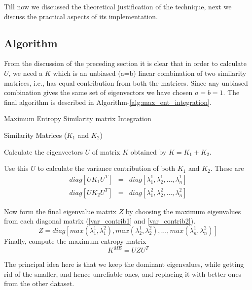 Till now we discussed the theoretical justification of the technique, next we discuss the practical aspects of its implementation.

\subsection{Algorithm}
From the discussion of the preceding section it is clear that in order to calculate $U$, we need a $K$ which is an unbiased (a=b) linear combination of two similarity matrices, i.e., has equal contribution from both the matrices. Since any unbiased combination gives the same set of eigenvectors we have chosen $a=b=1$. The final algorithm is described in Algorithm-\ref{alg:max_ent_integration}.

\begin{algorithm}[h]
\caption{Maximum Entropy Similarity matrix Integration}
\label{alg:max_ent_integration}
\begin{algorithmic}[1]
\REQUIRE Similarity Matrices ($K_{1}$ and $K_{2}$) 

\STATE Calculate the eigenvectors $U$ of matrix $K$ obtained by $K = K_{1} + K_{2}$.

\STATE Use this $U$ to calculate the variance contribution of both $K_{1}$ and $K_{2}$. These are  
\begin{eqnarray}
	diag[UK_{1}U^{T}] &=&  diag[\lambda^{1}_{1},\lambda^{1}_{2},\dots,\lambda^{1}_{n}] \label{var_contrib1} \\
	diag[UK_{2}U^{T}] &=&  diag[\lambda^{2}_{1},\lambda^{2}_{2},\dots,\lambda^{2}_{n}] \label{var_contrib2}
\end{eqnarray}

\STATE Now form the final eigenvalue matrix $Z$ by choosing the maximum eigenvalues from each diagonal matrix (\ref{var_contrib1} and \ref{var_contrib2}).
\begin{displaymath}
	Z =  diag[max(\lambda^{1}_{1},\lambda^{2}_{1}),max(\lambda^{1}_{2},\lambda^{2}_{2}),\dots,max(\lambda^{1}_{n},\lambda^{2}_{n})] 
\end{displaymath}
\STATE Finally, compute the maximum entropy matrix 
\begin{displaymath}
	K^{ME} = UZU^{T}
\end{displaymath}
\end{algorithmic}
\end{algorithm}  

The principal idea here is that we keep the dominant eigenvalues, while getting rid of the smaller, and hence unreliable ones, and replacing it with better ones from the other dataset. 
